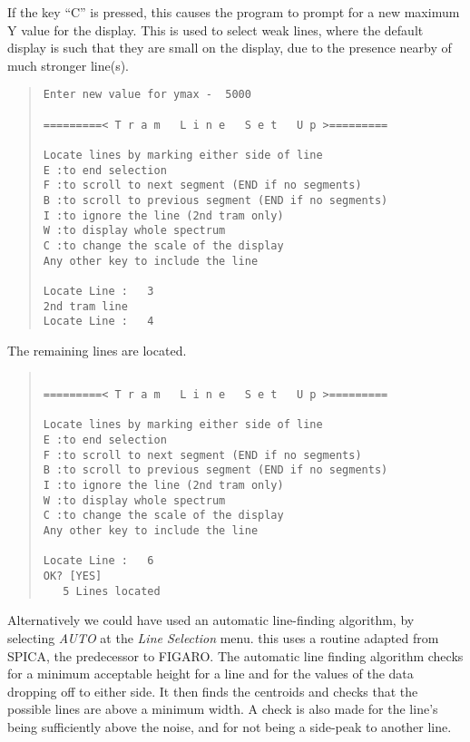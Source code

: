 If the key ``C'' is pressed, this causes the program to prompt for a new
maximum Y value for the display.
This is used to select weak lines, where the default display is such
that they are small on the display, due to the presence nearby of much
stronger line(s).
\begin{quote}\begin{verbatim}
Enter new value for ymax -  5000
 
=========< T r a m   L i n e   S e t   U p >=========
 
Locate lines by marking either side of line
E :to end selection
F :to scroll to next segment (END if no segments)
B :to scroll to previous segment (END if no segments)
I :to ignore the line (2nd tram only)
W :to display whole spectrum
C :to change the scale of the display
Any other key to include the line
 
Locate Line :   3
2nd tram line
Locate Line :   4
\end{verbatim}\end{quote}
The remaining lines are located.
\begin{quote}\begin{verbatim} 
 
=========< T r a m   L i n e   S e t   U p >=========
 
Locate lines by marking either side of line
E :to end selection
F :to scroll to next segment (END if no segments)
B :to scroll to previous segment (END if no segments)
I :to ignore the line (2nd tram only)
W :to display whole spectrum
C :to change the scale of the display
Any other key to include the line
 
Locate Line :   6
OK? [YES]
   5 Lines located

\end{verbatim}\end{quote}
Alternatively we could have used an automatic line-finding algorithm, by
selecting {\it AUTO} at the {\it Line Selection} menu.
this uses a routine adapted from SPICA, the predecessor to FIGARO.
The automatic line finding algorithm checks for a
minimum acceptable height for a line and for the values of the data
dropping off to either side. It then finds the centroids and checks
that the possible lines are above a minimum width. A check is also made
for the line's being sufficiently above the noise, and for not being a
side-peak to another line.

